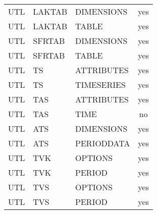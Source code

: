 \begin{longtable}{p{1.5cm} p{1.5cm} p{3cm} c}
\hline
UTL & LAKTAB & DIMENSIONS & yes \\ 
UTL & LAKTAB & TABLE & yes \\ 
\hline
UTL & SFRTAB & DIMENSIONS & yes \\ 
UTL & SFRTAB & TABLE & yes \\ 
\hline
UTL & TS & ATTRIBUTES & yes \\ 
UTL & TS & TIMESERIES & yes \\ 
\hline
UTL & TAS & ATTRIBUTES & yes \\ 
UTL & TAS & TIME & no \\ 
\hline
UTL & ATS & DIMENSIONS & yes \\ 
UTL & ATS & PERIODDATA & yes \\ 
\hline
UTL & TVK & OPTIONS & yes \\ 
UTL & TVK & PERIOD & yes \\ 
\hline
UTL & TVS & OPTIONS & yes \\ 
UTL & TVS & PERIOD & yes \\ 


\hline
\end{longtable}
\label{table:blocks}
\normalsize
